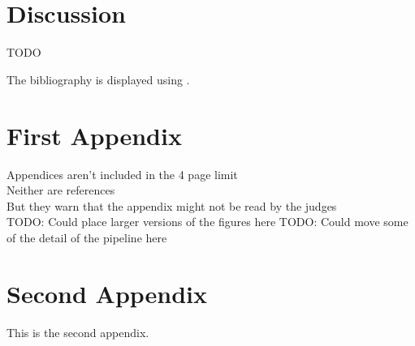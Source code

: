 \documentclass[pmlr,twocolumn,10pt]{jmlr} %
\begin{document}
\section{Discussion}

TODO


The bibliography is displayed using \verb||.




\appendix

\section{First Appendix}\label{apd:first}

Appendices aren't included in the 4 page limit\\
Neither are references\\
But they warn that the appendix might not be read by the judges\\

TODO: Could place larger versions of the figures here
TODO: Could move some of the detail of the pipeline here

\section{Second Appendix}\label{apd:second}

This is the second appendix.
\end{document}
